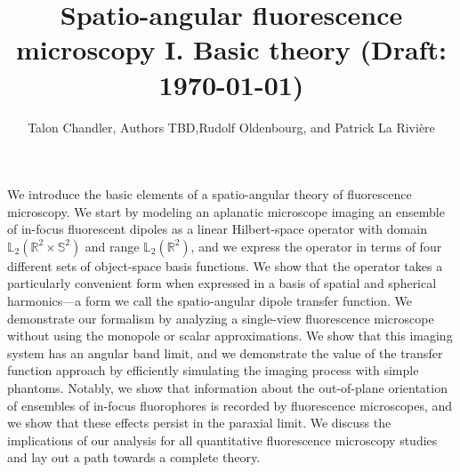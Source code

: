 \documentclass[]{osa-article}
\providecommand{\mbb}[1]{\mathbb{#1}}
\begin{document}
\title{Spatio-angular fluorescence microscopy I. Basic theory (Draft: \today)}

\author{Talon Chandler, Authors TBD,Rudolf Oldenbourg, and Patrick La Rivi\`ere }

\address{University of Chicago, Department of Radiology, Chicago, Illinois 60637, USA\\
Publications Department, The Optical Society, 2010 Massachusetts Avenue NW, Washington, DC 20036, USA\\
Currently with the Department of Electronic Journals, The Optical Society, 2010 Massachusetts Avenue NW, Washington, DC 20036, USA}




\begin{abstract*}
  We introduce the basic elements of a spatio-angular theory of fluorescence
  microscopy. We start by modeling an aplanatic microscope imaging an ensemble
  of in-focus fluorescent dipoles as a linear Hilbert-space operator with domain
  $\mbb{L}_2(\mbb{R}^2\times\mbb{S}^2)$ and range $\mbb{L}_2(\mbb{R}^2)$, and we
  express the operator in terms of four different sets of object-space basis
  functions. We show that the operator takes a particularly convenient form when
  expressed in a basis of spatial and spherical harmonics---a form we call the
  spatio-angular dipole transfer function. We demonstrate our formalism by
  analyzing a single-view fluorescence microscope without using the monopole or
  scalar approximations. We show that this imaging system has an angular band
  limit, and we demonstrate the value of the transfer function approach by
  efficiently simulating the imaging process with simple phantoms. Notably, we
  show that information about the out-of-plane orientation of ensembles of
  in-focus fluorophores is recorded by fluorescence microscopes, and we show
  that these effects persist in the paraxial limit. We discuss the implications
  of our analysis for all quantitative fluorescence microscopy studies and lay
  out a path towards a complete theory.
\end{abstract*}
\end{document}
